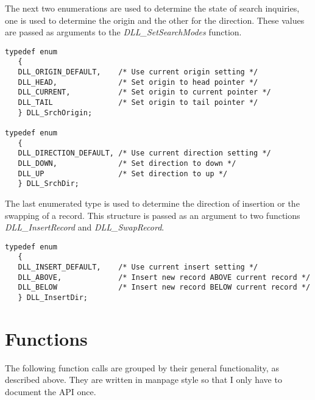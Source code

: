 \documentclass[10pt,letterpaper,titlepage]{article}
\begin{document}
\noindent
The next two enumerations are used to determine the state of search inquiries, one is used to determine the origin and the other for the direction.  These values are passed as arguments to the \emph{DLL\_SetSearchModes} function.

\small
\begin{verbatim}
typedef enum
   {
   DLL_ORIGIN_DEFAULT,    /* Use current origin setting */
   DLL_HEAD,              /* Set origin to head pointer */
   DLL_CURRENT,           /* Set origin to current pointer */
   DLL_TAIL               /* Set origin to tail pointer */
   } DLL_SrchOrigin;

typedef enum
   {
   DLL_DIRECTION_DEFAULT, /* Use current direction setting */
   DLL_DOWN,              /* Set direction to down */
   DLL_UP                 /* Set direction to up */
   } DLL_SrchDir;
\end{verbatim}
\normalsize
\vspace{8pt}

\noindent
The last enumerated type is used to determine the direction of insertion or the swapping of a record.  This structure is passed as an argument to two functions \emph{DLL\_InsertRecord} and \emph{DLL\_SwapRecord}.

\small
\begin{verbatim}
typedef enum
   {
   DLL_INSERT_DEFAULT,    /* Use current insert setting */
   DLL_ABOVE,             /* Insert new record ABOVE current record */
   DLL_BELOW              /* Insert new record BELOW current record */
   } DLL_InsertDir;
\end{verbatim}
\normalsize
\pagebreak

\section{Functions}
The following function calls are grouped by their general functionality, as described above.  They are written in manpage style so that I only have to document the API once.
\end{document}
